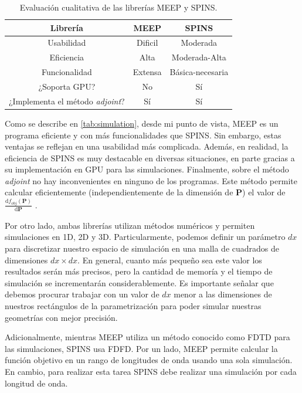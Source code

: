 \begin{table}[ht]
    \centering
    \begin{tabular}{|c|c|c|}
    \hline
    \textbf{Librería} & \textbf{MEEP} & \textbf{SPINS} \\
    \hline
    Usabilidad & Dificil & Moderada \\
    Eficiencia & Alta & Moderada-Alta \\
    Funcionalidad & Extensa & Básica-necesaria \\
    ¿Soporta GPU? & No & Sí \\
    ¿Implementa el método \emph{adjoint}? & Sí & Sí \\
    \hline 
    \end{tabular}
    \caption{Evaluación cualitativa de las librerías MEEP y SPINS.}
    \label{tab:simulation}
\end{table}

Como se describe en \autoref{tab:simulation}, desde mi punto de vista, MEEP es un programa eficiente y
con más funcionalidades que SPINS. Sin embargo, estas ventajas se reflejan en una usabilidad más
complicada. Además, en realidad, la eficiencia de SPINS es muy destacable en diversas situaciones,
en parte gracias a su implementación en GPU para las simulaciones. 
Finalmente, sobre el método \emph{adjoint} no hay inconvenientes en ninguno de los programas.
Este método permite calcular eficientemente (independientemente de la dimensión de $\boldsymbol{P}$) 
el valor de $\frac{\mathrm d f_{obj}(\boldsymbol{P})}{\mathrm d \boldsymbol{P}}$ \citep{Molesky2018}.

Por otro lado, ambas librerías utilizan métodos numéricos y permiten simulaciones en 1D, 2D y 3D.
Particularmente, podemos definir un parámetro $dx$ para discretizar nuestro espacio de
simulación en una malla de cuadrados de dimensiones $dx \times dx$.
En general, cuanto más pequeño sea este valor
los resultados serán más precisos, pero la cantidad de memoría y el tiempo de
simulación se incrementarán considerablemente.
Es importante señalar que debemos procurar trabajar con un valor de $dx$ menor a las dimensiones
de nuestros rectángulos de la parametrización para poder simular nuestras geometrías con mejor
precisión.


Adicionalmente, mientras MEEP utiliza un método conocido como FDTD para las simulaciones,
SPINS usa FDFD. Por un lado, MEEP permite calcular la función objetivo en un rango de longitudes
de onda usando una sola simulación. En cambio, para realizar esta tarea SPINS debe realizar una simulación
por cada longitud de onda.

